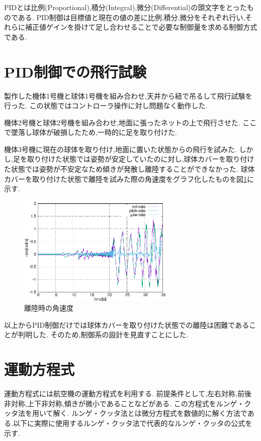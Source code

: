 \documentclass[12pt,oneside]{sotsuken_paper}
\begin{document}
PIDとは比例(Proportional),積分(Integral),微分(Differential)の頭文字をとったものである.
PID制御は目標値と現在の値の差に比例,積分,微分をそれぞれ行い,それらに補正値ゲインを掛けて足し合わせることで必要な制御量を求める制御方式である.\cite{pid}

\section{PID制御での飛行試験}
製作した機体1号機と球体1号機を組み合わせ,天井から紐で吊るして飛行試験を行った.
この状態ではコントローラ操作に対し問題なく動作した.

機体2号機と球体2号機を組み合わせ,地面に張ったネットの上で飛行させた.
ここで墜落し球体が破損したため,一時的に足を取り付けた.

機体3号機に現在の球体を取り付け,地面に置いた状態からの飛行を試みた.
しかし,足を取り付けた状態では姿勢が安定していたのに対し,球体カバーを取り付けた状態では姿勢が不安定なため傾きが発散し離陸することができなかった.
球体カバーを取り付けた状態で離陸を試みた際の角速度をグラフ化したものを図\ref{fig:test-1}に示す.

\begin{figure}[htbp]
	\begin{center}
		\includegraphics[width=75mm]{image/test-1.eps}
		\caption{離陸時の角速度}
		\label{fig:test-1}
	\end{center}
\end{figure}

以上からPID制御だけでは球体カバーを取り付けた状態での離陸は困難であることが判明した.
そのため,制御系の設計を見直すことにした.

\section{運動方程式}
運動方程式には航空機の運動方程式を利用する.
前提条件として,左右対称,前後非対称,上下非対称,傾きが微小であることなどがある.
この方程式をルンゲ・クッタ法を用いて解く.
ルンゲ・クッタ法とは微分方程式を数値的に解く方法である.以下に実際に使用するルンゲ・クッタ法で代表的なルンゲ・クッタの公式を示す.
\end{document}
